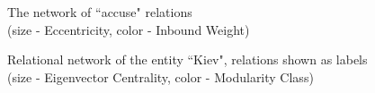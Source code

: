 \documentclass[]{article}
\begin{document}
\begin{figure}[htbp]
  \centering
    \captionsetup{justification=centering}
    \caption{The network of ``accuse" relations \\ (size - Eccentricity, color - Inbound Weight)}
  \label{Accusations}
\end{figure}
\begin{figure}[htbp]
  \centering
    \captionsetup{justification=centering}
    \caption{Relational network of the entity ``Kiev", relations shown as labels (size - Eigenvector Centrality, color - Modularity Class)}
  \label{KievNetwork}
\end{figure}
\end{document}
